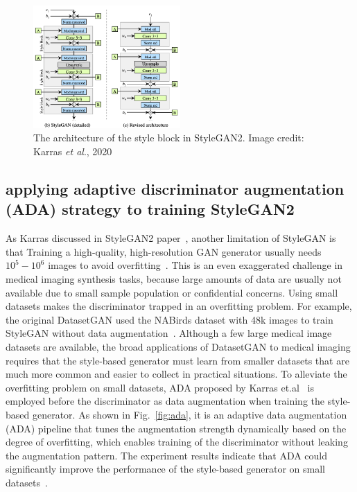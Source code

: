 \documentclass[conference]{IEEEtran}
\newcommand{\etal}{\textit{et al}.}
\begin{document}
\begin{figure}[!ht]
  \includegraphics[width=0.5\textwidth]{./fig/stylegan2_blk.png} 
  \caption{The architecture of the style block in StyleGAN2. 
  Image credit: Karras \etal, 2020\cite{Karras2020AnalyzingAI}}
  \label{fig:stylegan2}
\end{figure}

\subsection{applying adaptive discriminator augmentation (ADA) strategy to training StyleGAN2} 
As Karras discussed in StyleGAN2 paper~\cite{Karras2020AnalyzingAI}, another limitation of StyleGAN is that Training a high-quality, high-resolution GAN generator usually needs $10^5-10^6$ images to avoid overfitting~\cite{karras2020training}. 
This is an even exaggerated challenge in medical imaging synthesis tasks, because large amounts of data are usually not available due to small sample population or confidential concerns. Using small datasets makes the discriminator trapped in an overfitting problem. 
For example, the original DatasetGAN used the NABirds dataset with 48k images to train StyleGAN without data augmentation~\cite{Zhang2021DatasetGANEL}. 
Although a few large medical image datasets are available, the broad applications of DatasetGAN to medical imaging requires that the style-based generator must learn from smaller datasets that are much more common and easier to collect in practical situations. 
To alleviate the overfitting problem on small datasets, ADA proposed by Karras et.al~\cite{karras2020training} is employed before the discriminator as data augmentation when training the style-based generator. 
As shown in Fig.~\ref{fig:ada}, it is an adaptive data augmentation (ADA) pipeline that tunes the augmentation strength dynamically based on the degree of overfitting, which enables training of the discriminator without leaking the augmentation pattern. 
The experiment results indicate that ADA could significantly improve the performance of the style-based generator on small datasets~\cite{karras2020training}.  
\end{document}

